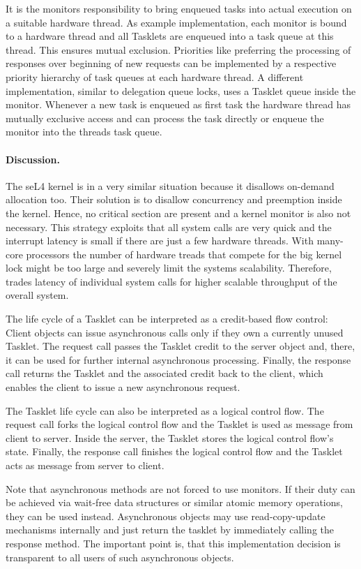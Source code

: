 It is the monitors responsibility to bring enqueued tasks into actual execution on a suitable hardware thread. As example implementation, each monitor is bound to a hardware thread and all Tasklets are enqueued into a task queue at this thread. This ensures mutual exclusion. Priorities like preferring the processing of responses over beginning of new requests can be implemented by a respective priority hierarchy of task queues at each hardware thread. A different implementation, similar to delegation queue locks, uses a Tasklet queue inside the monitor. Whenever a new task is enqueued as first task the hardware thread has mutually exclusive access and can process the task directly or enqueue the monitor into the threads task queue.

\paragraph{Discussion.}
The seL4 kernel is in a very similar situation because it disallows on-demand allocation too. Their solution is to disallow concurrency and preemption inside the kernel. Hence, no critical section are present and a kernel monitor is also not necessary. This strategy exploits that all system calls are very quick and the interrupt latency is small if there are just a few hardware threads. With many-core processors the number of hardware treads that compete for the big kernel lock might be too large and severely limit the systems scalability. Therefore, \mythos trades latency of individual system calls for higher scalable throughput of the overall system. 

The life cycle of a Tasklet can be interpreted as a credit-based flow control: Client objects can issue asynchronous calls only if they own a currently unused Tasklet. The request call passes the Tasklet credit to the server object and, there, it can be used for further internal asynchronous processing. Finally, the response call returns the Tasklet and the associated credit back to the client, which enables the client to issue a new asynchronous request. 

The Tasklet life cycle can also be interpreted as a logical control flow. The request call forks the logical control flow and the Tasklet is used as message from client to server. Inside the server, the Tasklet stores the logical control flow's state. Finally, the response call finishes the logical control flow and the Tasklet acts as message from server to client.

Note that asynchronous methods are not forced to use monitors. If their duty can be achieved via wait-free data structures or similar atomic memory operations, they can be used instead. Asynchronous objects may use read-copy-update mechanisms internally and just return the tasklet by immediately calling the response method. The important point is, that this implementation decision is transparent to all users of such asynchronous objects.

